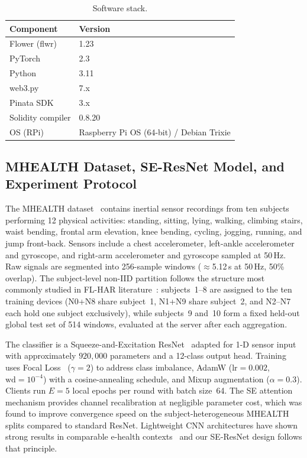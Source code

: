 \documentclass{llncs}
\begin{document}
\begin{table}[h]
\caption{Software stack.}
\label{tab:sw}
\centering\footnotesize
\begin{tabular}{ll}
\toprule
\textbf{Component} & \textbf{Version} \\
\midrule
Flower (flwr)        & 1.23 \\
PyTorch              & 2.3 \\
Python               & 3.11 \\
web3.py              & 7.x \\
Pinata SDK           & 3.x \\
Solidity compiler    & 0.8.20 \\
OS (RPi)             & Raspberry Pi OS (64-bit) / Debian Trixie \\
\bottomrule
\end{tabular}
\end{table}

\subsection{MHEALTH Dataset, SE-ResNet Model, and Experiment Protocol}

The MHEALTH dataset~\cite{banos2014mhealth} contains inertial sensor
recordings from ten subjects performing 12 physical activities: standing,
sitting, lying, walking, climbing stairs, waist bending, frontal arm
elevation, knee bending, cycling, jogging, running, and jump front-back.
Sensors include a chest accelerometer, left-ankle accelerometer and
gyroscope, and right-arm accelerometer and gyroscope sampled at 50\,Hz.
Raw signals are segmented into 256-sample windows ($\approx$5.12\,s at 50\,Hz, 50\% overlap). The
subject-level non-IID partition follows the structure most commonly studied
in FL-HAR literature~\cite{aouedi2024harsurvey,shiri2025dlharsurvey}:
subjects~1--8 are assigned to the ten training devices (N0+N8 share subject~1,
N1+N9 share subject~2, and N2--N7 each hold one subject exclusively), while
subjects~9 and~10 form a fixed held-out global test set of 514 windows,
evaluated at the server after each aggregation.

The classifier is a Squeeze-and-Excitation ResNet~\cite{hu2018senet} adapted
for 1-D sensor input with approximately $920{,}000$ parameters and a
12-class output head. Training uses Focal Loss~\cite{lin2017focal}
($\gamma=2$) to address class imbalance, AdamW ($\text{lr}=0.002$,
$\text{wd}=10^{-4}$) with a cosine-annealing schedule, and Mixup augmentation
($\alpha=0.3$). Clients run $E=5$ local epochs per round with batch size~64.
The SE attention mechanism provides channel recalibration at negligible
parameter cost, which was found to improve convergence speed on the
subject-heterogeneous MHEALTH splits compared to standard ResNet.
Lightweight CNN architectures have shown strong results in comparable
e-health contexts~\cite{baltabay2023lightweight,yatbaz2021activity} and our
SE-ResNet design follows that principle.
\end{document}
